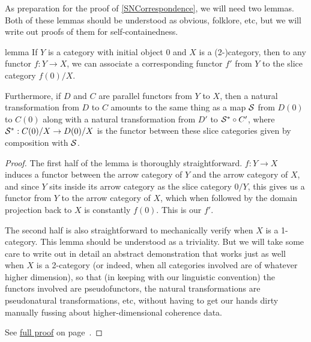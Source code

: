 \documentclass[./main.tex]{subfiles}
\begin{document}
As preparation for the proof of \cref{SNCorrespondence}, we will need two lemmas. Both of these lemmas should be understood as obvious, folklore, etc, but we will write out proofs of them for self-containedness.

\begin{theoremEnd}[category=IntrospLemmas]{lemma}\label{Lemma1}
If $Y$ is a category with initial object $0$ and $X$ is a (2-)category, then to any functor $f : Y \to X$, we can associate a corresponding functor $f'$ from $Y$ to the slice category $f(0)/X$.

Furthermore, if $D$ and $C$ are parallel functors from $Y$ to $X$, then a natural transformation from $D$ to $C$ amounts to the same thing as a map $\mathcal{S}$ from $D(0)$ to $C(0)$ along with a natural transformation from $D'$ to $\mathcal{S}^{*} \circ C'$, where $\mathcal{S}^{*} : C(0)/X \to D(0)/X$ is the functor between these slice categories given by composition with $\mathcal{S}$.
\end{theoremEnd}
\begin{proof}
The first half of the lemma is thoroughly straightforward. $f : Y \to X$ induces a functor between the arrow category of $Y$ and the arrow category of $X$, and since $Y$ sits inside its arrow category as the slice category $0/Y$, this gives us a functor from $Y$ to the arrow category of $X$, which when followed by the domain projection back to $X$ is constantly $f(0)$. This is our $f'$.

The second half is also straightforward to mechanically verify when $X$ is a 1-category. This lemma should be understood as a triviality. But we will take some care to write out in detail an abstract demonstration that works just as well when $X$ is a 2-category (or indeed, when all categories involved are of whatever higher dimension), so that (in keeping with our linguistic convention) the functors involved are pseudofunctors, the natural transformations are pseudonatural transformations, etc, without having to get our hands dirty manually fussing about higher-dimensional coherence data.

See \hyperref[proof:prAtEnd\pratendcountercurrent]{full proof} on page~\pageref{proof:prAtEnd\pratendcountercurrent}.
\end{proof}
\end{document}

